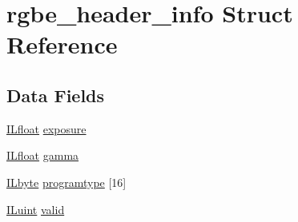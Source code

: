 \hypertarget{structrgbe__header__info}{\section{rgbe\-\_\-header\-\_\-info Struct Reference}
\label{structrgbe__header__info}
}
\subsection*{Data Fields}
\begin{DoxyCompactItemize}
\item 
\hyperlink{il_8h_a0576415379485bafa4b5f61989797b5e}{I\-Lfloat} \hyperlink{structrgbe__header__info_ac038afb0d6bbc183478809667dff2cc5}{exposure}
\item 
\hyperlink{il_8h_a0576415379485bafa4b5f61989797b5e}{I\-Lfloat} \hyperlink{structrgbe__header__info_ab75fcdc81a4080498789adc642289878}{gamma}
\item 
\hyperlink{il_8h_a88e562dacd22f4efcf6f9d31b85d4f92}{I\-Lbyte} \hyperlink{structrgbe__header__info_afd7a3d511f313a2285921795770ac680}{programtype} \mbox{[}16\mbox{]}
\item 
\hyperlink{il_8h_ac6508d0e9c19e32f32e00d54b5b8cf30}{I\-Luint} \hyperlink{structrgbe__header__info_a3315e77a958829d03f04081e4ef5055f}{valid}
\end{DoxyCompactItemize}


